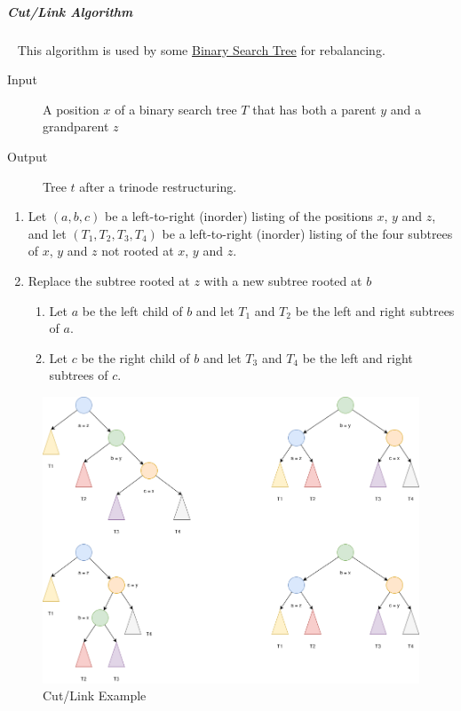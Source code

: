 \documentclass[11pt,twoside,twocolumn,landscape]{article}
\begin{document}
\subparagraph{Cut/Link Algorithm} \
\label{sec:org000babb}
This algorithm is used by some \href{../../../roam/20211008140953-binary_search_tree.org}{Binary Search Tree} for rebalancing. 

\begin{description}
\item[{Input}] A position \(x\) of a binary search tree \(T\) that has both a parent \(y\) and a grandparent \(z\)
\item[{Output}] Tree \(t\) after a trinode restructuring.
\end{description}


\begin{enumerate}
\item Let \((a, b, c)\) be a left-to-right (inorder) listing of the positions \(x\), \(y\) and \(z\), and let \((T_1, T_2, T_3, T_4)\) be a left-to-right (inorder) listing of the four subtrees of \(x\), \(y\) and \(z\) not rooted at \(x\), \(y\) and \(z\).
\item Replace the subtree rooted at \(z\) with a new subtree rooted at \(b\)
\begin{enumerate}
\item Let \(a\) be the left child of \(b\) and let \(T_1\) and \(T_2\) be the left and right subtrees of \(a\).
\item Let \(c\) be the right child of \(b\) and let \(T_3\) and \(T_4\) be the left and right subtrees of \(c\).
\end{enumerate}
\end{enumerate}




\begin{figure}[htbp]
\centering
\includegraphics[width=.9\linewidth]{img/cut_link.drawio.png}
\caption{\label{fig:org8042c1d}Cut/Link Example}
\end{figure}
\end{document}
